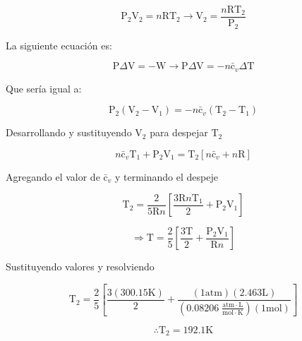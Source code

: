 \documentclass[12pt]{article}
\begin{document}
\begin{displaymath}
	\mathrm{P}_2\mathrm{V}_2=n\mathrm{R}\mathrm{T}_2 \rightarrow \mathrm{V}_2=\frac{n\mathrm{R}\mathrm{T}_2}{\mathrm{P}_2}
\end{displaymath}

La siguiente ecuación es:

\begin{displaymath}
	\mathrm{P}\Delta\mathrm{V}=-\mathrm{W} \rightarrow 	\mathrm{P}\Delta\mathrm{V}= -n\mathrm{\bar{c}}_v\Delta\mathrm{T}
\end{displaymath}

Que sería igual a:

\begin{displaymath}
	\mathrm{P}_2(\mathrm{V}_2-\mathrm{V}_1)=-n\mathrm{\bar{c}}_v(\mathrm{T}_2-\mathrm{T}_1)
\end{displaymath}

Desarrollando y sustituyendo $\mathrm{V}_2$ para despejar $\mathrm{T}_2$

\begin{displaymath}
	n\mathrm{\bar{c}}_v\mathrm{T}_1+\mathrm{P}_2\mathrm{V}_1=\mathrm{T}_2\left[ n\mathrm{\bar{c}}_v+n\mathrm{R} \right]
\end{displaymath}

Agregando el valor de $\mathrm{\bar{c}}_v$ y terminando el despeje

\begin{displaymath}
	\mathrm{T}_2=\frac{2}{5\mathrm{R}n}\left[ \frac{3\mathrm{R}n\mathrm{T}_1}{2}+\mathrm{P}_2\mathrm{V}_1 \right]
\end{displaymath}

\begin{displaymath}
	\Rightarrow	\mathrm{T}=\frac{2}{5}\left[ \frac{3\mathrm{T}}{2}+\frac{\mathrm{P}_2\mathrm{V}_1}{\mathrm{R}n} \right]
\end{displaymath}

Sustituyendo valores y resolviendo

\begin{displaymath}
	\mathrm{T}_2=\frac{2}{5} \left[ \frac{3(300.15\mathrm{K})}{2}+\frac{(1\mathrm{atm})(2.463\mathrm{L})}{(0.08206\; \frac{\mathrm{atm}\cdot\mathrm{L}}{\mathrm{mol}\cdot\mathrm{K}})(1\mathrm{mol})} \right]
\end{displaymath}

\begin{displaymath}
	\therefore \mathrm{T}_2=192.1\mathrm{K}
\end{displaymath}
\end{document}
